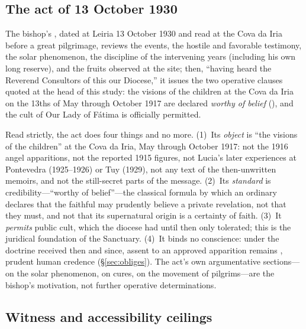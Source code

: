 \subsection{The act of 13 October 1930}

The bishop's , dated at Leiria 13 October 1930 and read at the Cova da
Iria before a great pilgrimage, reviews the events, the hostile and
favorable testimony, the solar phenomenon, the discipline of the
intervening years (including his own long reserve), and the fruits
observed at the site; then, ``having heard the Reverend Consultors of
this our Diocese,'' it issues the two operative clauses quoted at the
head of this study: the visions of the children at the Cova da Iria
on the 13ths of May through October 1917 are declared \emph{worthy of
belief} (), and the cult of Our Lady of
F\'atima is officially permitted.

Read strictly, the act does four things and no more. (1)~Its
\emph{object} is ``the visions of the children'' at the Cova da Iria,
May through October 1917: not the 1916 angel apparitions, not the
reported 1915 figures, not Lucia's later experiences at Pontevedra
(1925--1926) or Tuy (1929), not any text of the then-unwritten
memoirs, and not the still-secret parts of the message. (2)~Its
\emph{standard} is credibility---``worthy of belief''---the classical
formula by which an ordinary declares that the faithful may prudently
believe a private revelation, not that they must, and not that its
supernatural origin is a certainty of faith. (3)~It \emph{permits}
public cult, which the diocese had until then only tolerated; this is
the juridical foundation of the Sanctuary. (4)~It binds no
conscience: under the doctrine received then and since, assent to an
approved apparition remains , prudent human
credence (\S\ref{sec:obliges}). The act's own argumentative sections---on the solar
phenomenon, on cures, on the movement of pilgrims---are the bishop's
motivation, not further operative determinations.

\subsection{Witness and accessibility ceilings}

